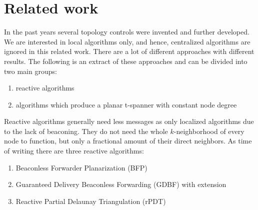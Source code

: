 

%



\section{Related work}

In the past years several topology controls were invented and further developed.
We are interested in local algorithms only, and hence, centralized algorithms are ignored in this related work.
There are a lot of different approaches with different results.
The following is an extract of these approaches and can be divided into two main groups:
\begin{enumerate}
\item reactive algorithms
\item algorithms which produce a planar t-spanner with constant node degree
\end{enumerate}

Reactive algorithms generally need less messages as only localized algorithms due to the lack of beaconing.
They do not need the whole $k $-neighborhood of every node to function, but only a fractional amount of their direct neighbors.
As time of writing there are three reactive algorithms:
\begin{enumerate}
\item Beaconless Forwarder Planarization (BFP)
\item Guaranteed Delivery Beaconless Forwarding (GDBF) with extension
\item Reactive Partial Delaunay Triangulation (rPDT)
\end{enumerate}

